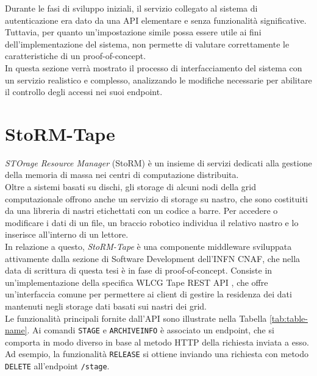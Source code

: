 Durante le fasi di sviluppo iniziali, il servizio collegato al sistema di autenticazione era dato da una API
elementare e senza funzionalità significative.
\\ Tuttavia, per quanto un'impostazione simile possa essere utile ai fini dell'implementazione del sistema, non 
permette di valutare correttamente le caratteristiche di un proof-of-concept.
\\ In questa sezione verrà mostrato il processo di interfacciamento del sistema con un servizio 
realistico e complesso, analizzando le modifiche necessarie per abilitare il controllo degli accessi
nei suoi endpoint. 

\section{StoRM-Tape}
\textit{STOrage Resource Manager} (StoRM) \cite{storm} è un insieme di servizi dedicati alla gestione della memoria 
di massa nei centri di computazione distribuita.
 \\ Oltre a sistemi basati su dischi, gli storage di alcuni nodi della grid computazionale offrono anche 
 un servizio di storage su nastro, che 
sono costituiti da una libreria di nastri etichettati con un codice a barre.
Per accedere o modificare i dati di un file, 
un braccio robotico individua il relativo nastro e lo inserisce all'interno di un lettore.
\\ In relazione a questo, \textit{StoRM-Tape} è una componente middleware sviluppata
attivamente dalla sezione di Software Development dell'INFN CNAF, che nella data di scrittura di questa tesi è in fase di proof-of-concept.
Consiste in un'implementazione della specifica {WLCG Tape REST API} \cite{wlcg_tape_doc}, che offre un'interfaccia comune per permettere 
ai client di gestire la residenza dei dati mantenuti negli storage dati basati sui nastri dei grid. 
\\ Le funzionalità principali fornite dall'API sono illustrate nella Tabella \ref*{tab:table-name}. Ai comandi \texttt{STAGE} e \texttt{ARCHIVEINFO} è associato un endpoint,
che si comporta in modo diverso in base al metodo HTTP della richiesta inviata a esso. Ad esempio, la funzionalità \texttt{RELEASE}
si ottiene inviando una richiesta con metodo \texttt{DELETE} all'endpoint \texttt{/stage}.


